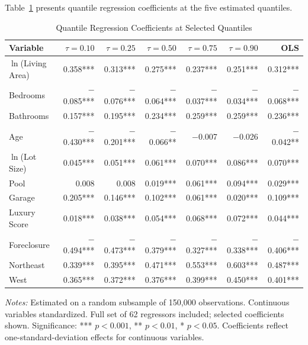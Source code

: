 Table~\ref{tab:qr_results} presents quantile regression coefficients at the five estimated quantiles.

\begin{table}[H]
\centering
\caption{Quantile Regression Coefficients at Selected Quantiles}
\label{tab:qr_results}
\begin{threeparttable}
\small
\begin{tabular}{lrrrrrr}
\toprule
Variable & $\tau=0.10$ & $\tau=0.25$ & $\tau=0.50$ & $\tau=0.75$ & $\tau=0.90$ & OLS \\
\midrule
$\ln$(Living Area) & 0.358*** & 0.313*** & 0.275*** & 0.237*** & 0.251*** & 0.312*** \\
Bedrooms & $-$0.085*** & $-$0.076*** & $-$0.064*** & $-$0.037*** & $-$0.034*** & $-$0.068*** \\
Bathrooms & 0.157*** & 0.195*** & 0.234*** & 0.259*** & 0.259*** & 0.236*** \\
Age & $-$0.430*** & $-$0.201*** & $-$0.066** & $-$0.007 & $-$0.026 & $-$0.042** \\
$\ln$(Lot Size) & 0.045*** & 0.051*** & 0.061*** & 0.070*** & 0.086*** & 0.070*** \\
Pool & 0.008 & 0.008 & 0.019*** & 0.061*** & 0.094*** & 0.029*** \\
Garage & 0.205*** & 0.146*** & 0.102*** & 0.061*** & 0.020*** & 0.109*** \\
Luxury Score & 0.018*** & 0.038*** & 0.054*** & 0.068*** & 0.072*** & 0.044*** \\
Foreclosure & $-$0.494*** & $-$0.473*** & $-$0.379*** & $-$0.327*** & $-$0.338*** & $-$0.406*** \\
Northeast & 0.339*** & 0.395*** & 0.471*** & 0.553*** & 0.603*** & 0.487*** \\
West & 0.365*** & 0.372*** & 0.376*** & 0.399*** & 0.450*** & 0.401*** \\
\bottomrule
\end{tabular}
\begin{tablenotes}
\small
\item \textit{Notes:} Estimated on a random subsample of 150,000 observations. Continuous variables standardized. Full set of 62 regressors included; selected coefficients shown. Significance: *** $p<0.001$, ** $p<0.01$, * $p<0.05$. Coefficients reflect one-standard-deviation effects for continuous variables.
\end{tablenotes}
\end{threeparttable}
\end{table}

